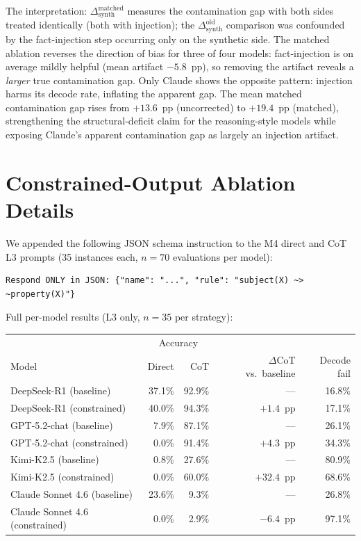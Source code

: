 \documentclass{article}
\theoremstyle{definition}
\begin{document}
The interpretation: $\Delta_{\mathrm{synth}}^{\mathrm{matched}}$ measures the contamination gap with both sides treated identically (both with injection); the $\Delta_{\mathrm{synth}}^{\mathrm{old}}$ comparison was confounded by the fact-injection step occurring only on the synthetic side. The matched ablation reverses the direction of bias for three of four models: fact-injection is on average mildly helpful (mean artifact $-5.8$~pp), so removing the artifact reveals a \emph{larger} true contamination gap. Only Claude shows the opposite pattern: injection harms its decode rate, inflating the apparent gap. The mean matched contamination gap rises from $+13.6$~pp (uncorrected) to $+19.4$~pp (matched), strengthening the structural-deficit claim for the reasoning-style models while exposing Claude's apparent contamination gap as largely an injection artifact.

\section{Constrained-Output Ablation Details}\label{app:constrained}

We appended the following JSON schema instruction to the M4 direct and CoT L3 prompts (35 instances each, $n=70$ evaluations per model):

\begin{verbatim}
Respond ONLY in JSON: {"name": "...", "rule": "subject(X) ~> ~property(X)"}
\end{verbatim}

Full per-model results (L3 only, $n=35$ per strategy):

\begin{table}[h]
\centering
\small
\begin{tabular}{lrrr|r}
\toprule
 & \multicolumn{2}{c}{Accuracy} & & \\
Model & Direct & CoT & $\Delta$CoT vs.\ baseline & Decode fail \\
\midrule
DeepSeek-R1 (baseline) & 37.1\% & 92.9\% & --- & 16.8\% \\
DeepSeek-R1 (constrained) & 40.0\% & 94.3\% & $+1.4$~pp & 17.1\% \\
\midrule
GPT-5.2-chat (baseline) & \phantom{0}7.9\% & 87.1\% & --- & 26.1\% \\
GPT-5.2-chat (constrained) & \phantom{0}0.0\% & 91.4\% & $+4.3$~pp & 34.3\% \\
\midrule
Kimi-K2.5 (baseline) & \phantom{0}0.8\% & 27.6\% & --- & 80.9\% \\
Kimi-K2.5 (constrained) & \phantom{0}0.0\% & 60.0\% & $+32.4$~pp & 68.6\% \\
\midrule
Claude Sonnet 4.6 (baseline) & 23.6\% & \phantom{0}9.3\% & --- & 26.8\% \\
Claude Sonnet 4.6 (constrained) & \phantom{0}0.0\% & \phantom{0}2.9\% & $-6.4$~pp & 97.1\% \\
\bottomrule
\end{tabular}
\end{table}
\end{document}
